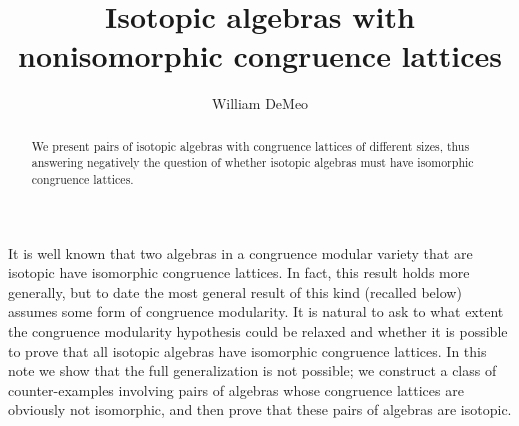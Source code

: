 \documentclass{au}
\theoremstyle{plain}
\newcommand{\<}{\ensuremath{\langle}}
\renewcommand{\>}{\ensuremath{\rangle}}
\begin{document}

\title[Isotopic algebras]{Isotopic algebras with nonisomorphic congruence lattices}

\author[W. DeMeo]{William DeMeo}
\address{Department of Mathematics\\
University of South Carolina\\Columbia 29208\\USA}








\begin{abstract}
We present pairs of isotopic algebras with congruence lattices of different
sizes, thus answering negatively the question of whether isotopic algebras
must have isomorphic congruence lattices.
\end{abstract}

\maketitle

It is well known that two algebras in a congruence modular variety that are
isotopic have isomorphic congruence lattices.  In fact, this result holds more
generally, but to date the most general result of this kind (recalled below)
assumes some form of congruence modularity. %
It is natural to ask to what extent the congruence modularity hypothesis could
be relaxed and whether it is possible to prove that all isotopic algebras have
isomorphic congruence lattices.   In this note we show
that the full generalization is not possible; we construct a class of
counter-examples involving pairs of algebras whose
congruence lattices are obviously not isomorphic, and then prove that these
pairs of algebras are isotopic.
\end{document}
